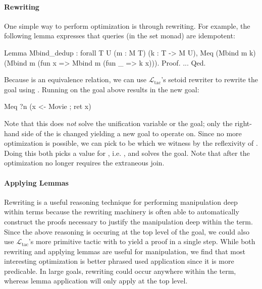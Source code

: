 \documentclass[preprint]{sigplanconf}
\newcommand{\ltac}[0]{\ensuremath{\mathcal{L}_{\mathrm{tac}}}}
\begin{document}
\paragraph{Rewriting}
One simple way to perform optimization is through rewriting.
For example, the following lemma expresses that queries (in the set monad) are idempotent:
\begin{coq}
Lemma Mbind_dedup : forall {T U} (m : M T) (k : T -> M U),
  Meq (Mbind m k) (Mbind m (fun x => Mbind m (fun _ => k x))).
Proof. ... Qed.
\end{coq}
Because  is an equivalence relation, we can use \ltac's setoid rewriter to rewrite the goal using .
Running  on the goal above results in the new goal:
\begin{coq}
Meq ?n (x <- Movie ; ret x)
\end{coq}
Note that this does \emph{not} solve the unification variable  or the goal; only the right-hand side of the  is changed yielding a new goal to operate on.
Since no more optimization is possible, we can pick  to be  which we witness by the reflexivity of .
Doing this both picks a value for , i.e. , and solves the goal.
Note that after the optimization  no longer requires the extraneous join.

\paragraph{Applying Lemmas}
Rewriting is a useful reasoning technique for performing manipulation deep within terms because the rewriting machinery is often able to automatically construct the proofs necessary to justify the manipulation deep within the term.
Since the above reasoning is occuring at the top level of the goal, we could also use \ltac's more primitive  tactic with  to yield a proof in a single step.
While both rewriting and applying lemmas are useful for manipulation, we find that most interesting optimization is better phrased used application since it is more predicable.
In large goals, rewriting could occur anywhere within the term, whereas lemma application will only apply at the top level.
\end{document}
